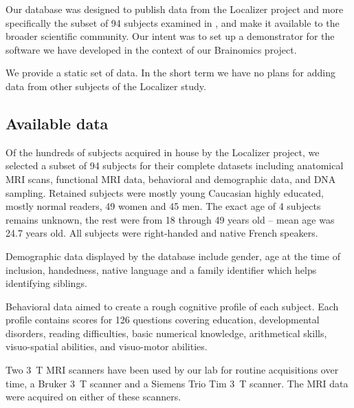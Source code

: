 \documentclass[preprint,12pt]{elsarticle}
\begin{document}
Our database was designed to publish data from the Localizer project \cite{Pinel2007} and more specifically the subset of 94 subjects examined in \cite{Pinel2012}, and make it available to the broader scientific community. Our intent was to set up a demonstrator for the software we have developed in the context of our Brainomics project.

We provide a static set of data. In the short term we have no plans for adding data from other subjects of the Localizer study.

\subsection{Available data}

Of the hundreds of subjects acquired in house by the Localizer project, we selected a subset of 94 subjects for their complete datasets \cite{Pinel2012} including anatomical MRI scans, functional MRI data, behavioral and demographic data, and DNA sampling. Retained subjects were mostly young Caucasian highly educated, mostly normal readers, 49 women and 45 men. The exact age of 4 subjects remains unknown, the rest were from 18 through 49 years old -- mean age was 24.7 years old. All subjects were right-handed and native French speakers.

Demographic data displayed by the database include gender, age at the time of inclusion, handedness, native language and a family identifier which helps identifying siblings.

Behavioral data aimed to create a rough cognitive profile of each subject. Each profile contains scores for 126 questions covering education, developmental disorders, reading difficulties, basic numerical knowledge, arithmetical skills, visuo-spatial abilities, and visuo-motor abilities.

Two 3~T MRI scanners have been used by our lab for routine acquisitions over time, a Bruker 3~T scanner and a Siemens Trio Tim 3~T scanner. The MRI data were acquired on either of these scanners. 
\end{document}
